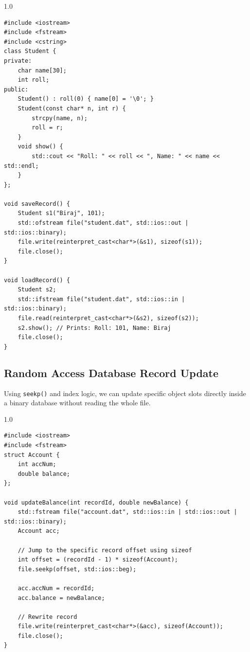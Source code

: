 \documentclass[12pt,a4paper]{article}
\begin{document}
\begin{tcolorbox}[examplebox, title={Code Example: Reading and writing objects to binary files}]
\begin{spacing}{1.0}
\begin{verbatim}
#include <iostream>
#include <fstream>
#include <cstring>
class Student {
private:
    char name[30];
    int roll;
public:
    Student() : roll(0) { name[0] = '\0'; }
    Student(const char* n, int r) {
        strcpy(name, n);
        roll = r;
    }
    void show() {
        std::cout << "Roll: " << roll << ", Name: " << name << std::endl;
    }
};

void saveRecord() {
    Student s1("Biraj", 101);
    std::ofstream file("student.dat", std::ios::out | std::ios::binary);
    file.write(reinterpret_cast<char*>(&s1), sizeof(s1));
    file.close();
}

void loadRecord() {
    Student s2;
    std::ifstream file("student.dat", std::ios::in | std::ios::binary);
    file.read(reinterpret_cast<char*>(&s2), sizeof(s2));
    s2.show(); // Prints: Roll: 101, Name: Biraj
    file.close();
}
\end{verbatim}
\end{spacing}
\end{tcolorbox}

\subsection{Random Access Database Record Update}
Using \texttt{seekp()} and index logic, we can update specific object slots directly inside a binary database without reading the whole file.

\begin{tcolorbox}[examplebox, title={Code Example: Random Access database record update}]
\begin{spacing}{1.0}
\begin{verbatim}
#include <iostream>
#include <fstream>
struct Account {
    int accNum;
    double balance;
};

void updateBalance(int recordId, double newBalance) {
    std::fstream file("account.dat", std::ios::in | std::ios::out | std::ios::binary);
    Account acc;
    
    // Jump to the specific record offset using sizeof
    int offset = (recordId - 1) * sizeof(Account);
    file.seekp(offset, std::ios::beg);
    
    acc.accNum = recordId;
    acc.balance = newBalance;
    
    // Rewrite record
    file.write(reinterpret_cast<char*>(&acc), sizeof(Account));
    file.close();
}
\end{verbatim}
\end{spacing}
\end{tcolorbox}
\end{document}
